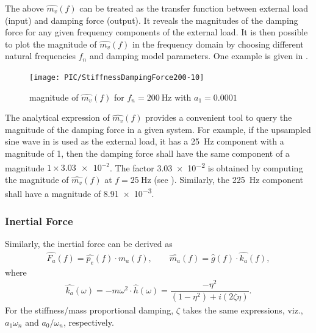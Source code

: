 The above $\hat{m_v}\left(f\right)$ can be treated as the transfer function between external load (input) and damping force (output). It reveals the magnitudes of the damping force for any given frequency components of the external load. It is then possible to plot the magnitude of $\hat{m_v}\left(f\right)$ in the frequency domain by choosing different natural frequencies $f_n$ and damping model parameters. One example is given in .
\begin{figure}[htb!]
\centering
\texttt{[image: PIC/StiffnessDampingForce200-10]}
\caption{magnitude of $\hat{m_v}\left(f\right)$ for $f_n=\SI{200}{\hertz}$ with $a_1=0.0001$}\label{fig:k_proportional_damping}
\end{figure}
The analytical expression of $\hat{m_v}\left(f\right)$ provides a convenient tool to query the magnitude of the damping force in a given system. For example, if the upsampled sine wave in  is used as the external load, it has a \SI{25}{\hertz} component with a magnitude of \num{1}, then the damping force shall have the same component of a magnitude $1\times\num{3.03e-2}$. The factor \num{3.03e-2} is obtained by computing the magnitude of $\hat{m_v}\left(f\right)$ at $f=\SI{25}{\hertz}$ (see ). Similarly, the \SI{225}{\hertz} component shall have a magnitude of \num{8.91e-3}.
\subsubsection{Inertial Force}
Similarly, the inertial force can be derived as
\begin{gather}
\hat{F_a}\left(f\right)=\hat{p_e}\left(f\right)\cdot\hat{m_a}\left(f\right),\qquad
\hat{m_a}\left(f\right)=\hat{g}\left(f\right)\cdot\hat{k_a}\left(f\right),
\end{gather}
where
\begin{gather}\label{eq:inertial_force}
\hat{k_a}\left(\omega\right)=-m\omega^2\cdot\hat{h}\left(\omega\right)=\dfrac{-\eta^2}{\left(1-\eta^2\right)+i\left(2\zeta\eta\right)}.
\end{gather}
For the stiffness/mass proportional damping, $\zeta$ takes the same expressions, viz., $a_1\omega_n$ and $a_0/\omega_n$, respectively.
